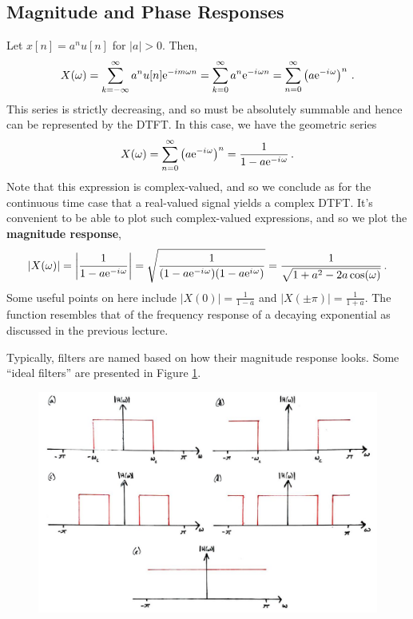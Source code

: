 \subsection{Magnitude and Phase Responses}
%
\begin{exmp}
  Let $x[n] = a^n u[n]$ for $|a|>0$. Then,
  \begin{displaymath}
    X(\omega) = \sum_{k=-\infty}^\infty a^n u[n]\mathrm{e}^{-im\omega n} = \sum_{k=0}^\infty a^n\mathrm{e}^{-{i\mkern1mu}\omega n}
    = \sum_{n=0}^\infty\left(a\mathrm{e}^{-{i\mkern1mu}\omega}\right)^n \,.
  \end{displaymath}
  This series is strictly decreasing, and so must be absolutely summable and
  hence can be represented by the DTFT. In this case, we have the geometric series
  \begin{displaymath}
    X(\omega) = \sum_{n=0}^\infty\left(a\mathrm{e}^{-{i\mkern1mu}\omega}\right)^n = \frac{1}{1-a\mathrm{e}^{-{i\mkern1mu}\omega}} \,.
  \end{displaymath}
  Note that this expression is complex-valued, and so we conclude as for the continuous
  time case that a real-valued signal yields a complex DTFT. It's convenient to be
  able to plot such complex-valued expressions, and so we plot the
  \textbf{magnitude response},
  \begin{displaymath}
    |X(\omega)| = \left|\frac{1}{1-a\mathrm{e}^{-{i\mkern1mu}\omega}}\right|
    = \sqrt{\frac{1}{(1-a\mathrm{e}^{-{i\mkern1mu}\omega})(1-a\mathrm{e}^{{i\mkern1mu}\omega})}}
    = \frac{1}{\sqrt{1 + a^2 - 2a\cos(\omega)}} \,.
  \end{displaymath}
  Some useful points on here include $|X(0)| = \frac{1}{1-a}$ and 
  $|X(\pm\pi)| = \frac{1}{1+a}$. The function resembles that of the frequency
  response of a decaying exponential as discussed in the previous lecture.
\end{exmp}
%
Typically, filters are named based on how their magnitude response looks. Some
``ideal filters'' are presented in Figure \ref{fig::lecture_7_ideal_filters}.
%
\begin{figure}[H]
  \includegraphics[width=\textwidth]{images/lecture_7_ideal_filters.JPG}
  \caption{
  }
  \label{fig::lecture_7_ideal_filters}
\end{figure}
